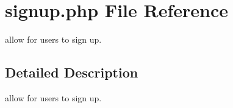 \hypertarget{signup_8php}{}\section{signup.\+php File Reference}
\label{signup_8php}


allow for users to sign up.  




\subsection{Detailed Description}
allow for users to sign up. 

